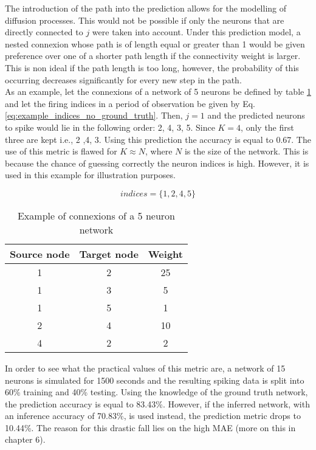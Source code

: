 The introduction of the path into the prediction allows for the modelling of diffusion processes. This would not be possible if only the neurons that are directly connected to \(j\) were taken into account. Under this prediction model, a nested connexion whose path is of length equal or greater than 1 would be given preference over one of a shorter path length if the connectivity weight is larger. This is non ideal if the path length is too long, however, the probability of this occurring decreases significantly for every new step in the path. \\

As an example, let the connexions of a network of 5 neurons be defined by table \ref{tab:example_connexions_no_ground_truth} and let the firing indices in a period of observation be given by Eq.\ref{eq:example_indices_no_ground_truth}. Then, \(j=1\) and the predicted neurons to spike would lie in the following order: 2, 4, 3, 5. Since \(K=4\), only the first three are kept i.e., 2 ,4, 3. Using this prediction the accuracy is equal to 0.67. The use of this metric is flawed for \(K\approx N\), where \(N\) is the size of the network. This is because the chance of guessing correctly the neuron indices is high. However, it is used in this example for illustration purposes.

\begin{equation}
indices = \{1, 2, 4, 5\}
\label{eq:example_indices_no_ground_truth}
\end{equation}

\begin{table}[]
\centering
\begin{tabular}{|c|c|c|}
\hline
Source node & Target node & Weight \\ \hline
1           & 2           & 25     \\ \hline
1           & 3           & 5      \\ \hline
1           & 5           & 1      \\ \hline
2           & 4           & 10     \\ \hline
4           & 2           & 2      \\ \hline
\end{tabular}
\caption{Example of connexions of a 5 neuron network}
\label{tab:example_connexions_no_ground_truth}
\end{table}

In order to see what the practical values of this metric are, a network of 15 neurons is simulated for 1500 seconds and the resulting spiking data is split into 60\% training and 40\% testing. Using the knowledge of the ground truth network, the prediction accuracy is equal to 83.43\%. However, if the inferred network, with an inference accuracy of 70.83\%, is used instead, the prediction metric drops to 10.44\%. The reason for this drastic fall lies on the high MAE (more on this in chapter 6).

